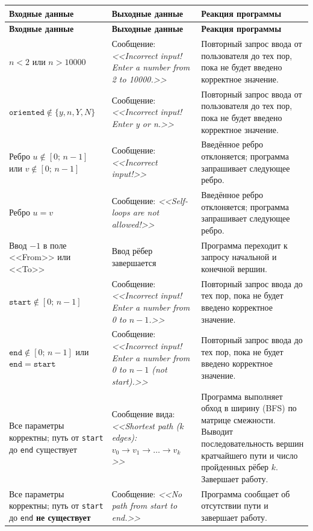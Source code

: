 \documentclass{article}[14pt]
\begin{document}
\begin{longtable}{|>{\raggedright\arraybackslash}p{3.2cm}
                  |>{\raggedright\arraybackslash}p{4.5cm}
                  |>{\raggedright\arraybackslash}p{7.3cm}|}
\hline
\textbf{Входные данные} & \textbf{Выходные данные} & \textbf{Реакция программы} \\
\hline
\endfirsthead
\hline
\textbf{Входные данные} & \textbf{Выходные данные} & \textbf{Реакция программы} \\
\hline
\endhead
 
$n < 2$ или $n > 10000$ &
Сообщение: \textit{<<Incorrect input! Enter a number from 2 to 10000.>>} &
Повторный запрос ввода от пользователя до тех пор, пока не будет введено корректное значение. \\
\hline
 
$\mathtt{oriented} \notin \{y, n, Y, N\}$ &
Сообщение: \textit{<<Incorrect input! Enter y or n.>>} &
Повторный запрос ввода от пользователя до тех пор, пока не будет введено корректное значение. \\
\hline
 
Ребро $u \notin [0;\, n{-}1]$ или $v \notin [0;\, n{-}1]$ &
Сообщение: \textit{<<Incorrect input!>>} &
Введённое ребро отклоняется; программа запрашивает следующее ребро. \\
\hline
 
Ребро $u = v$ &
Сообщение: \textit{<<Self-loops are not allowed!>>} &
Введённое ребро отклоняется; программа запрашивает следующее ребро. \\
\hline
 
Ввод $-1$ в поле <<From>> или <<To>> &
Ввод рёбер завершается &
Программа переходит к запросу начальной и конечной вершин. \\
\hline
 
$\mathtt{start} \notin [0;\, n{-}1]$ &
Сообщение: \textit{<<Incorrect input! Enter a number from 0 to $n{-}1$.>>} &
Повторный запрос ввода до тех пор, пока не будет введено корректное значение. \\
\hline
 
$\mathtt{end} \notin [0;\, n{-}1]$ или $\mathtt{end} = \mathtt{start}$ &
Сообщение: \textit{<<Incorrect input! Enter a number from 0 to $n{-}1$ (not start).>>} &
Повторный запрос ввода до тех пор, пока не будет введено корректное значение. \\
\hline
 
Все параметры корректны; путь от \texttt{start} до \texttt{end} существует &
Сообщение вида: \textit{<<Shortest path ($k$ edges): $v_0 \to v_1 \to \dots \to v_k$>>} &
Программа выполняет обход в ширину (BFS) по матрице смежности. Выводит последовательность вершин кратчайшего пути и число пройденных рёбер $k$. Завершает работу. \\
\hline
 
Все параметры корректны; путь от \texttt{start} до \texttt{end} \textbf{не существует} &
Сообщение: \textit{<<No path from start to end.>>} &
Программа сообщает об отсутствии пути и завершает работу. \\
\hline
 
\end{longtable}
\end{document}
